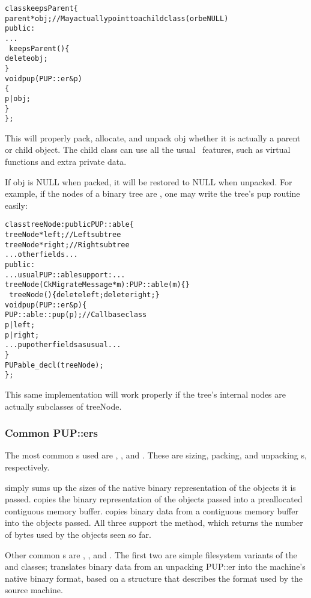 \begin{alltt}
class keepsParent \{
    parent *obj; //May actually point to a child class (or be NULL)
public:
    ...
    ~keepsParent() \{
        delete obj;
    \}
    void pup(PUP::er &p) 
    \{
        p|obj;
    \}
\};
\end{alltt}

This will properly pack, allocate, and unpack obj whether
it is actually a parent or child object.  The child class 
can use all the usual \CC\ features, such as virtual functions
and extra private data.

If obj is NULL when packed, it will be restored to NULL when unpacked.
For example, if the nodes of a binary tree are ,
one may write the tree's pup routine easily:

\begin{alltt}
class treeNode : public PUP::able \{
    treeNode *left;//Left subtree
    treeNode *right;//Right subtree
    ... other fields ...
public:
    ... usual PUP::able support: ...
    treeNode(CkMigrateMessage *m) : PUP::able(m) \{\}
    ~treeNode() \{delete left; delete right;\}
    void pup(PUP::er &p) \{
        PUP::able::pup(p);//Call base class
        p|left;
        p|right;
        ... pup other fields as usual ...
    \}
    PUPable\_decl(treeNode);
\};
\end{alltt}

This same implementation will work properly if the tree's
internal nodes are actually subclasses of treeNode.


\subsubsection{Common PUP::ers}
The most common s used are ,
, and .  These are sizing,
packing, and unpacking s, respectively.

 simply sums up the sizes of the native
binary representation of the objects it is passed.
 copies the binary representation of the
objects passed into a preallocated contiguous memory buffer.
 copies binary data from a contiguous memory
buffer into the objects passed.  All three support the
 method, which returns the number of bytes used
by the objects seen so far.

Other common s are , 
, and .  The first
two are simple filesystem variants of the  
and  classes;  translates
binary data from an unpacking PUP::er into the machine's
native binary format, based on a  structure
that describes the format used by the source machine.


